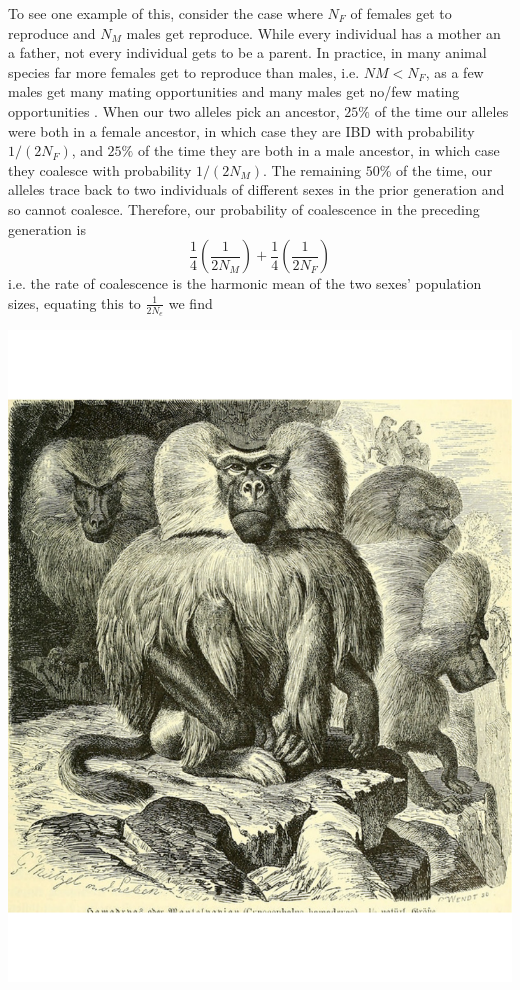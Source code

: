 To see one example of this, consider the case where $N_F$ of  females get to reproduce and $N_M$ males get reproduce.
While every individual has a mother an a father, not every individual gets to be a parent. In practice, in many animal species far more females get to reproduce than males, i.e. $NM <N_F$, as a few males get many mating opportunities and many males get no/few mating opportunities \citep[see ][for a broad analysis, and note that there a certainly many exceptions to this general pattern]{janicke:16}. When our two alleles pick an ancestor, $25\%$ of the time our alleles were both in a female ancestor, in which case they are IBD with probability $1/(2N_F)$, and $25\%$ of the time they are both in a
male ancestor, in which case they coalesce with probability
$1/(2N_M)$. The remaining $50\%$ of the time, our alleles trace back to two individuals of different sexes in the prior generation and so cannot coalesce.  Therefore, our probability of coalescence in the preceding generation is 
\begin{equation}
\frac{1}{4}\left(\frac{1}{2N_M} \right)+\frac{1}{4}\left(\frac{1}{2N_F} \right) %
\end{equation}
i.e. the rate of coalescence is the harmonic mean of the two sexes' population sizes, equating this to $\frac{1}{2N_e}$ we find

\begin{marginfigure}
\begin{center}
\includegraphics[width= 0.7 \textwidth]{illustration_images/Genetic_drift/Hamadryas_baboon/Hamadryas_baboon.pdf}
\end{center}
\caption{Male Hamadryas baboons. Up to ten females live in a harem with a single male.  %
} \label{fig:Hamadryas_baboon}  
\end{marginfigure} 

